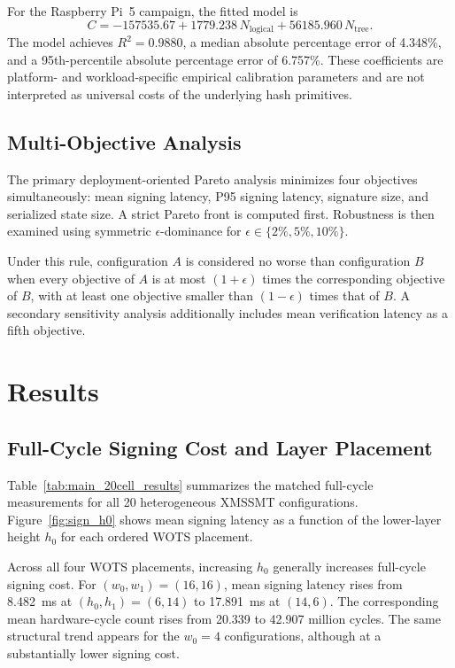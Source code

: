 \documentclass[pdflatex,sn-mathphys-num]{sn-jnl}
\begin{document}
For the Raspberry Pi~5 campaign, the fitted model is
\[
C =
-157535.67
+1779.238\,N_{\mathrm{logical}}
+56185.960\,N_{\mathrm{tree}}.
\]
The model achieves $R^2=0.9880$, a median absolute percentage error of
4.348\%, and a 95th-percentile absolute percentage error of 6.757\%.
These coefficients are platform- and workload-specific empirical
calibration parameters and are not interpreted as universal costs of
the underlying hash primitives.

\subsection{Multi-Objective Analysis}
\label{sec:pareto_method}

The primary deployment-oriented Pareto analysis minimizes four
objectives simultaneously: mean signing latency, P95 signing latency,
signature size, and serialized state size. A strict Pareto front is
computed first. Robustness is then examined using symmetric
$\epsilon$-dominance for $\epsilon\in\{2\%,5\%,10\%\}$.

Under this rule, configuration $A$ is considered no worse than
configuration $B$ when every objective of $A$ is at most
$(1+\epsilon)$ times the corresponding objective of $B$, with at least
one objective smaller than $(1-\epsilon)$ times that of $B$. A
secondary sensitivity analysis additionally includes mean verification
latency as a fifth objective.





\section{Results}
\label{sec:results}

\subsection{Full-Cycle Signing Cost and Layer Placement}
\label{sec:results_fullcycle}

Table~\ref{tab:main_20cell_results} summarizes the matched full-cycle
measurements for all 20 heterogeneous XMSSMT configurations.
Figure~\ref{fig:sign_h0} shows mean signing latency as a function of the
lower-layer height $h_0$ for each ordered WOTS placement.

Across all four WOTS placements, increasing $h_0$ generally increases
full-cycle signing cost. For $(w_0,w_1)=(16,16)$, mean signing latency
rises from 8.482~ms at $(h_0,h_1)=(6,14)$ to 17.891~ms at
$(14,6)$. The corresponding mean hardware-cycle count rises from
20.339 to 42.907 million cycles. The same structural trend appears for
the $w_0=4$ configurations, although at a substantially lower signing
cost.
\end{document}
